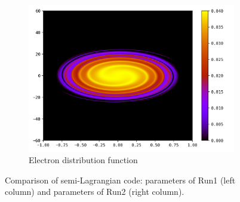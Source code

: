\documentclass{article}
\numberwithin{equation}{section}
\newcommand{\imh}{\textheight} %
\newcommand{\imw}{\textwidth} %
\begin{document}
\begin{figure}
\begin{subfigure}{\textwidth}
		\includegraphics[height=\imh,width=\imw]{images/fe_run5ac.png}
		\caption{Electron distribution function}
	\end{subfigure}
	\caption{Comparison of semi-Lagrangian code: parameters of Run1 (left column) and parameters of Run2 (right column).}
	\label{fig:comp_phasespace}
\end{figure}  



\end{document}
